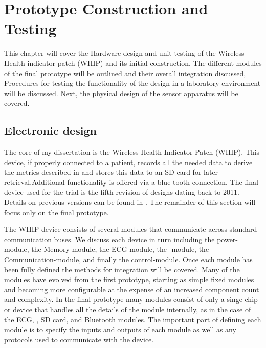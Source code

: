 \chapter{Prototype Construction and Testing}
\label{chap:ProtoTypeBuildTest}


This chapter will cover the Hardware design and unit testing of the Wireless Health indicator patch (WHIP) and its initial construction. The different modules of the final prototype will be outlined and their overall integration discussed, Procedures for testing the functionality of the design in a laboratory environment will be discussed. Next, the physical design of the sensor apparatus will be covered.

\section{Electronic design}


The core of my dissertation is the Wireless Health Indicator Patch (WHIP). This device, if properly connected to a patient, records all the needed data to derive the metrics described in \label{Sensor Concepts} and stores this data to an SD card for later retrieval.Additional  functionality is offered via a blue tooth connection. The final device used for the trial is the fifth revision of designs dating back to 2011. Details on previous versions can be found in . The remainder of this section will focus only on the final prototype.

The WHIP device consists of several modules that communicate across standard communication buses. We discuss each device in turn including the power-module, the Memory-module, the ECG-module, the -module, the Communication-module, and finally the control-module. Once each module has been fully defined the methods for integration will be covered. Many of the modules have evolved from the first prototype, starting as simple fixed modules and becoming more configurable at the expense of an increased component count and complexity. In the final prototype many modules consist of only a singe chip or device that handles all the details of the module internally, as in the case of the ECG, , SD card, and Bluetooth modules. The important part of defining each module is to specify the inputs and outputs of each module as well as any protocols used to communicate with the device.

